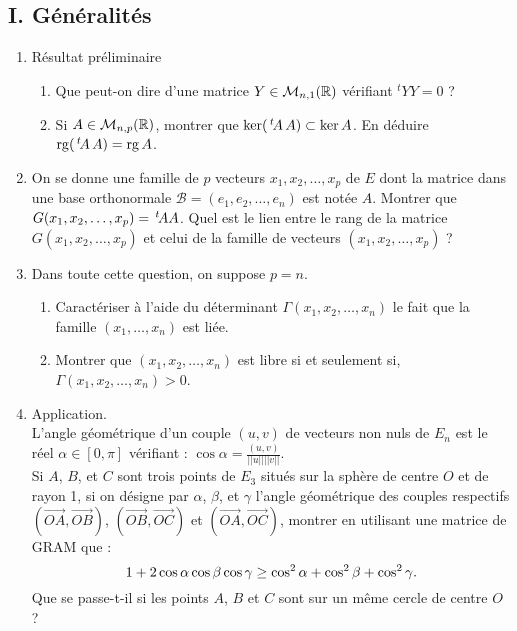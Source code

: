 \subsection*{I. Généralités}
 \begin{enumerate}
   \item Résultat préliminaire
   \begin{enumerate}
     \item Que peut-on dire d'une matrice $Y\in \mathcal{M}_{n,1}(\mathbb{R})$ vérifiant $^tY Y=0$ ?
     \item Si $A\in \mathcal{M}_{n,p}(\mathbb{R})$, montrer que $\ker(\,\mathstrut^t\! A\,A) \subset \ker A$. En déduire $\operatorname{rg} (\,\mathstrut^t\! A\, A)=\operatorname{rg} A$.
   \end{enumerate}
   \item On se donne une famille de $p$ vecteurs $x_1,x_2,\dots, x_p$  de $E$ dont la matrice dans une base orthonormale $\mathcal{B}=(e_1,e_2,\dots, e_n)$ est notée $A$.\newline
   Montrer que $G(x_1,x_2,\dots, x_p)= \,\mathstrut^t\! A A$. Quel est le lien entre le rang de la matrice $G(x_1,x_2,\dots, x_p)$ et celui de la famille de vecteurs $(x_1,x_2,\dots, x_p)$ ?
   \item Dans toute cette question, on suppose $p=n$.
   \begin{enumerate}
     \item Caractériser à l'aide du déterminant $\Gamma(x_1,x_2,\dots, x_n)$ le fait que la famille  $(x_1,\dots, x_n)$ est liée.
     \item  Montrer que $(x_1,x_2,\dots, x_n)$ est libre si et seulement si, $\Gamma(x_1,x_2,\dots, x_n)>0$.
   \end{enumerate}
   \item \label{4} Application.\\
   L'angle géométrique d'un couple $(u,v)$ de vecteurs non nuls de
   $E_n$ est le réel $\alpha\in[0,\pi]$ vérifiant :
   $\cos\alpha=\frac{(u,v)}{||u||||v||}$.\\
   Si $A$, $B$, et $C$ sont trois points de $E_3$ situés sur la
   sphère de centre $O$ et de rayon 1, si on désigne par $\alpha$,
   $\beta$, et $\gamma$ l'angle géométrique des couples respectifs
   $(\overrightarrow{OA},\overrightarrow{OB})$,  $(\overrightarrow{OB},\overrightarrow{OC})$
   et $(\overrightarrow{OA},\overrightarrow{OC})$, montrer en
   utilisant une matrice de GRAM que :
   $$1+2\cos\alpha\cos\beta\cos\gamma\geq\cos^2\alpha+\cos^2\beta+\cos^2\gamma.$$
   Que se passe-t-il si les points $A$, $B$ et $C$ sont sur un même cercle de centre $O$ ?

\end{enumerate}
